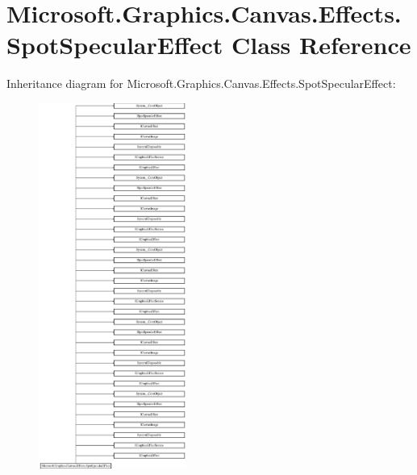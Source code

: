 \hypertarget{class_microsoft_1_1_graphics_1_1_canvas_1_1_effects_1_1_spot_specular_effect}{}\section{Microsoft.\+Graphics.\+Canvas.\+Effects.\+Spot\+Specular\+Effect Class Reference}
\label{class_microsoft_1_1_graphics_1_1_canvas_1_1_effects_1_1_spot_specular_effect}
Inheritance diagram for Microsoft.\+Graphics.\+Canvas.\+Effects.\+Spot\+Specular\+Effect\+:\begin{figure}[H]
\begin{center}
\leavevmode
\includegraphics[height=12.000000cm]{class_microsoft_1_1_graphics_1_1_canvas_1_1_effects_1_1_spot_specular_effect}
\end{center}
\end{figure}
